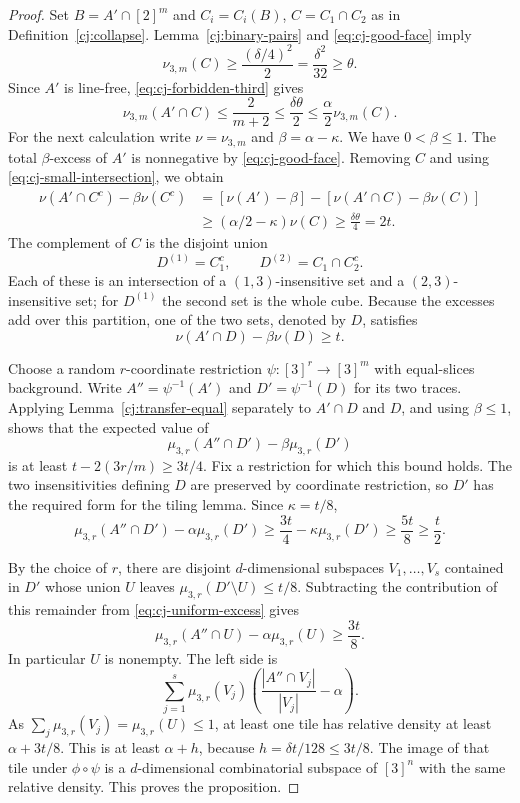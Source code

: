 \documentclass[11pt]{amsart}
\theoremstyle{definition}
\theoremstyle{remark}
\numberwithin{equation}{section}
\begin{document}
\begin{proof}
Set $B=A'\cap[2]^m$ and
$C_i=C_i(B)$, $C=C_1\cap C_2$ as in
Definition~\ref{cj:collapse}.  Lemma~\ref{cj:binary-pairs} and
\eqref{eq:cj-good-face} imply
\[
 \nu_{3,m}(C)\ge\frac{(\delta/4)^2}{2}
 =\frac{\delta^2}{32}\ge\theta.
\]
Since $A'$ is line-free,
\eqref{eq:cj-forbidden-third} gives
\begin{equation}\label{eq:cj-small-intersection}
 \nu_{3,m}(A'\cap C)
 \le\frac{2}{m+2}
 \le\frac{\delta\theta}{2}
 \le\frac\alpha2\nu_{3,m}(C).
\end{equation}
For the next calculation write $\nu=\nu_{3,m}$ and
$\beta=\alpha-\kappa$.  We have $0<\beta\le1$.  The total
$\beta$-excess of $A'$ is nonnegative by
\eqref{eq:cj-good-face}.  Removing $C$ and using
\eqref{eq:cj-small-intersection}, we obtain
\begin{align*}
 \nu(A'\cap C^c)-\beta\nu(C^c)
 &=[\nu(A')-\beta]-[\nu(A'\cap C)-\beta\nu(C)]\\
 &\ge(\alpha/2-\kappa)\nu(C)
 \ge\frac{\delta\theta}{4}=2t.
\end{align*}
The complement of $C$ is the disjoint union
\[
 D^{(1)}=C_1^c,
 \qquad
 D^{(2)}=C_1\cap C_2^c.
\]
Each of these is an intersection of a $(1,3)$-insensitive set and
a $(2,3)$-insensitive set; for $D^{(1)}$ the second set is the whole
cube.  Because the excesses add over this partition, one of the two
sets, denoted by $D$, satisfies
\begin{equation}\label{eq:cj-structured-excess}
 \nu(A'\cap D)-\beta\nu(D)\ge t.
\end{equation}

Choose a random $r$-coordinate restriction $\psi:[3]^r\to[3]^m$
with equal-slices background.  Write $A''=\psi^{-1}(A')$ and
$D'=\psi^{-1}(D)$ for its two traces.  Applying
Lemma~\ref{cj:transfer-equal} separately to $A'\cap D$ and $D$,
and using $\beta\le1$, shows that the expected value of
\[
 \mu_{3,r}(A''\cap D')-\beta\mu_{3,r}(D')
\]
is at least $t-2(3r/m)\ge3t/4$.  Fix a restriction for which
this bound holds.  The two insensitivities defining $D$ are
preserved by coordinate restriction, so $D'$ has the required
form for the tiling lemma.  Since $\kappa=t/8$,
\begin{equation}\label{eq:cj-uniform-excess}
 \mu_{3,r}(A''\cap D')-\alpha\mu_{3,r}(D')
 \ge\frac{3t}{4}-\kappa\mu_{3,r}(D')
 \ge\frac{5t}{8}\ge\frac t2.
\end{equation}

By the choice of $r$, there are disjoint $d$-dimensional subspaces
$V_1,\ldots,V_s$ contained in $D'$ whose union $U$ leaves
$\mu_{3,r}(D'\setminus U)\le t/8$.  Subtracting the contribution
of this remainder from \eqref{eq:cj-uniform-excess} gives
\[
 \mu_{3,r}(A''\cap U)-\alpha\mu_{3,r}(U)\ge\frac{3t}{8}.
\]
In particular $U$ is nonempty.  The left side is
\[
 \sum_{j=1}^s\mu_{3,r}(V_j)
       \left(\frac{|A''\cap V_j|}{|V_j|}-\alpha\right).
\]
As $\sum_j\mu_{3,r}(V_j)=\mu_{3,r}(U)\le1$, at least one tile
has relative density at least $\alpha+3t/8$.  This is at least
$\alpha+h$, because $h=\delta t/128\le3t/8$.
The image of that tile under $\phi\circ\psi$ is a
$d$-dimensional combinatorial subspace of $[3]^n$ with the same
relative density.  This proves the proposition.
\end{proof}
\end{document}
